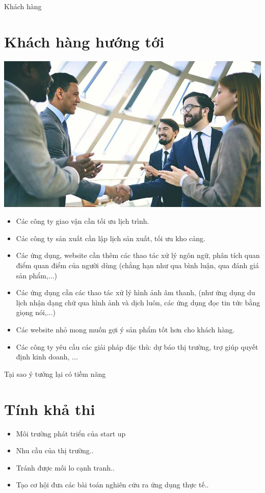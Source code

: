 \documentclass{beamer}
\begin{document}
\begin{frame}{Khách hàng}
\section{Khách hàng hướng tới}
\begin{center}
\includegraphics[scale=0.2]{B2B.jpg}
\end{center}

\begin{itemize}
\item Các công ty giao vận cần tối ưu lịch trình.
\item Các công ty sản xuất cần lập lịch sản xuất, tối ưu kho cảng.
\item Các ứng dụng, website cần thêm các thao tác xử lý ngôn ngữ, phân tích quan điểm quan điểm của người dùng (chẳng hạn như qua bình luận, qua đánh giá sản phẩm,...)
\item Các ứng dụng cần các thao tác xử lý hình ảnh âm thanh, (như ứng dụng du lịch nhận dạng chữ qua hình ảnh và dịch luôn, các ứng dụng đọc tin tức bằng giọng nói,...)
\item Các website nhỏ mong muốn gợi ý sản phẩm tốt hơn cho khách hàng.
\item Các công ty yêu cầu các giải pháp đặc thù: dự báo thị trường, trợ giúp quyết định kinh doanh, ... 

\end{itemize}

\end{frame}
\begin{frame}{Tại sao ý tưởng lại có tiềm năng}
\section{Tính khả thi }
\begin{itemize}
\item Môi trường phát triển của start up
\item Nhu cầu của thị trường..
\item Tránh được mối lo cạnh tranh..
\item Tạo cơ hội đưa các bài toán nghiên cứu ra ứng dụng thực tế..
\end{itemize} 
\end{frame}
\end{document}
